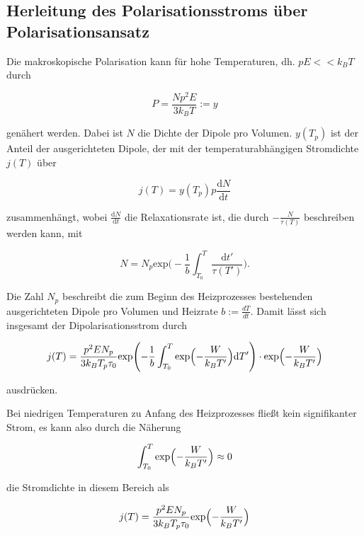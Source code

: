 \subsection{Herleitung des Polarisationsstroms über Polarisationsansatz}

Die makroskopische Polarisation kann für hohe Temperaturen, dh. $p E << k_B T $ durch 

\begin{equation}
    P = \frac{N p^2 E}{3 k_B T} := y
\end{equation}

genähert werden. Dabei ist $N$ die Dichte der Dipole pro Volumen. $y(T_p)$ ist der Anteil der ausgerichteten Dipole, der mit der temperaturabhängigen Stromdichte $j(T)$ über 

\begin{equation}
    j(T) = y(T_p) p \frac{\text{d}N}{\text{d}t}
\end{equation}

zusammenhängt, wobei $\frac{\text{d}N}{\text{d}t}$ die Relaxationsrate ist, die durch $- \frac{N}{\tau(T)}$ beschreiben werden kann, mit 

\begin{equation}
    N = N_p \text{exp} \Biggl( -\frac{1}{b} \int_{T_0}^{T} \frac{\text{d}t'}{\tau(T')} \Biggr).    
\end{equation}

Die Zahl $N_p$ beschreibt die zum Beginn des Heizprozesses bestehenden ausgerichteten Dipole pro Volumen und Heizrate $b := \frac{dT}{dt}$. 
Damit lässt sich insgesamt der Dipolarisationsstrom durch 

\begin{equation}
    j(T) = \frac{p^2 E N_p}{3 k_B T_p \tau_0} \text{exp} \Biggl(-\frac{1}{b} \int_{T_0}^{T} \text{exp} \Bigl( - \frac{W}{k_B T'} \Bigr) \text{d}T' \Biggr)\cdot 
    \text{exp} \Bigl( - \frac{W}{k_B T'} \Bigr)
\end{equation}

ausdrücken. 

Bei niedrigen Temperaturen zu Anfang des Heizprozesses fließt kein signifikanter Strom, es kann also durch die Näherung 

\begin{equation}
    \int_{T_0}^{T} \text{exp} \Bigl( - \frac{W}{k_B T'} \Bigr) \approx 0 
\end{equation}

die Stromdichte in diesem Bereich als 

\begin{equation}
    j(T) = \frac{p^2 E N_p}{3 k_B T_p \tau_0} \text{exp} \Bigl( - \frac{W}{k_B T'} \Bigr)
\end{equation}

